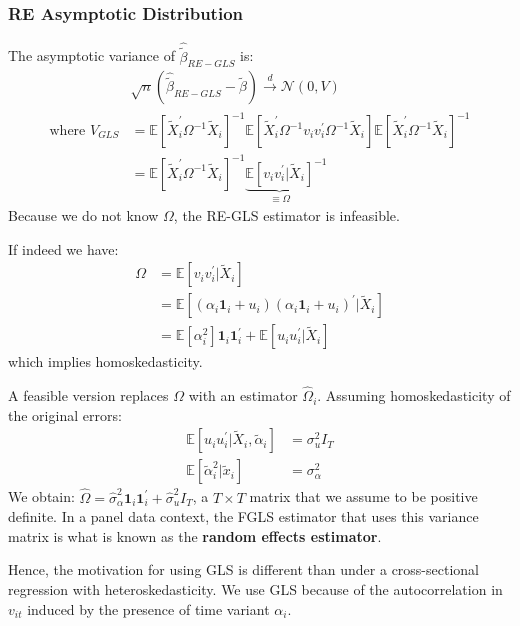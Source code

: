 \subsubsection{RE Asymptotic Distribution}
The asymptotic variance of $\hat{\tilde{\beta}}_{RE-GLS}$ is:
\begin{align*}
    &\sqrt{n} \left( \hat{\tilde{\beta}}_{RE-GLS} - \tilde{\beta} \right) \overset{d}{\rightarrow} \mathcal{N}\left(0, V \right) \\
    \text{where } V_{GLS}  &= \mathbb{E}\left[\tilde{X}_i^{\prime} \Omega^{-1} \tilde{X}_i \right]^{-1} \mathbb{E}\left[\tilde{X}_i^{\prime} \Omega^{-1} v_i v_i^{\prime} \Omega^{-1} \tilde{X}_i \right] \mathbb{E}\left[\tilde{X}_i^{\prime} \Omega^{-1} \tilde{X}_i \right]^{-1} \\
    &= \mathbb{E}\left[\tilde{X}_i^{\prime} \Omega^{-1} \tilde{X}_i \right]^{-1} \underset{\equiv \Omega}{\underbrace{\mathbb{E}[v_i v_i^{\prime} | \tilde{X}_i]}}^{-1}
\end{align*}
Because we do not know $\Omega$, the RE-GLS estimator is infeasible. 

If indeed we have:
\begin{align*}
    \Omega &= \mathbb{E}[v_i v_i^{\prime}  | \tilde{X}_i] \\
    &= \mathbb{E}[(\alpha_i \mathbf{1}_i + u_i)(\alpha_i \mathbf{1}_i  + u_i)^{\prime}  | \tilde{X}_i] \\
    &= \mathbb{E}[\alpha_i^2] \mathbf{1}_i \mathbf{1}_i^{\prime} + \mathbb{E}[u_i u_i^{\prime} | \tilde{X}_i]
\end{align*}
which implies homoskedasticity.

A feasible version replaces $\Omega$ with an estimator $\hat{\Omega}_i$.
Assuming homoskedasticity of the original errors:
\begin{align*}
    \mathbb{E}[u_i u_i^{\prime}  | \tilde{X}_i, \tilde{\alpha}_i] &= \sigma_u^2 I_T \\
    \mathbb{E}[\tilde{\alpha}_i^2 | \tilde{x}_i] &= \sigma_{\alpha}^2
\end{align*}
We obtain: $\hat{\Omega} = \hat{\sigma}_{\alpha}^2 \mathbf{1}_i \mathbf{1}_i^{\prime} + \hat{\sigma}_u^2 I_T$, 
a $T \times T$ matrix that we assume to be positive definite.
In a panel data context, the FGLS estimator that uses this variance matrix is what is known as the \textbf{random effects estimator}.

Hence, the motivation for using GLS is different than under a cross-sectional regression with heteroskedasticity.
We use GLS because of the autocorrelation in $v_{it}$ induced by the presence of time variant $\alpha_i$.

